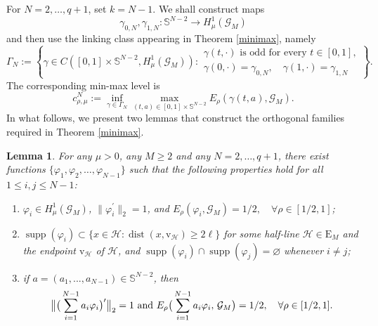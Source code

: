\documentclass[11pt]{amsart}
\newtheorem{lemma}[theorem]{Lemma}
\newcommand{\G}{\mathcal{G}}
\newcommand{\E}{\mathrm{E}}
\newcommand{\vv}{\mathrm{v}}
\numberwithin{equation}{section}
\begin{document}
For $N=2,\ldots,q+1$, set $k=N-1$. We shall construct maps
$$
\gamma_{0,N},\gamma_{1,N}:{\mathbb S}^{N-2}\to H^1_\mu(\G_M)
$$
and then use the linking class appearing in Theorem \ref{minimax}, namely
\begin{equation*}
\Gamma_N:=\left\{\gamma\in C([0,1]\times{\mathbb S}^{N-2},H^1_\mu(\G_M)):\begin{array}{l}
\gamma(t,\cdot)\text{ is odd for every }t\in[0,1],\\
\gamma(0,\cdot)=\gamma_{0,N},\quad \gamma(1,\cdot)=\gamma_{1,N}
\end{array}\right\}.
\end{equation*}
The corresponding min-max level is
\begin{equation*}
c_{\rho,\mu}^N:=\inf_{\gamma\in\Gamma_N}\max_{(t,a)\in[0,1]\times{\mathbb S}^{N-2}}E_\rho(\gamma(t,a),\G_M).
\end{equation*}
In what follows, we present two lemmas that construct the orthogonal families required in Theorem \ref{minimax}.
\begin{lemma}\label{lem lower endpoint}
For any $\mu>0$, any $M\geq 2$ and any $N=2,\ldots,q+1$, there exist functions \(\{\varphi_{1},\varphi_{2},\ldots,\varphi_{N-1}\}\) such that the following properties hold for all \(1\leq i,j\leq N-1\):
	\begin{enumerate}[label=(\roman*)]
		\item\(\varphi_{i}\in H^1_\mu(\G_M)\), \(\|\varphi^{\prime}_{i}\|_2=1\), and \(E_{\rho}(\varphi_{i},\mathcal{G}_M)=1/2, \quad \forall \rho \in [1/2,1]\);\label{lem4.31}
		\item $\operatorname{supp}(\varphi_{i}) \subset \{x \in \mathcal{H}: \operatorname{dist}(x,\vv_\mathcal{H}) \geq 2\ell\}$ for some half-line $\mathcal{H} \in \E_M$ and the endpoint $\vv_\mathcal{H}$ of $\mathcal{H}$, and \(\operatorname{supp}(\varphi_{i})\cap\operatorname{supp}(\varphi_{j})=\varnothing\) whenever \(i\neq j\);\label{lem4.32}
		\item if \(a=(a_1,...,a_{N-1})\in\mathbb{S}^{N-2}\),  then\\ 
        $$\big{\|}\big{(}\sum_{i=1}^{N-1}a_{i}\varphi_{i}\big{)}^{\prime}\big{\|}_2=1 \text{ and } E_{\rho}\big{(}\sum_{i=1}^{N-1}a_{i}\varphi_{i},\,\mathcal{G}_M\big{)}=1/2, \quad \forall \rho \in [1/2,1].$$\label{lem4.33}
\end{enumerate}
\end{lemma}
\end{document}
